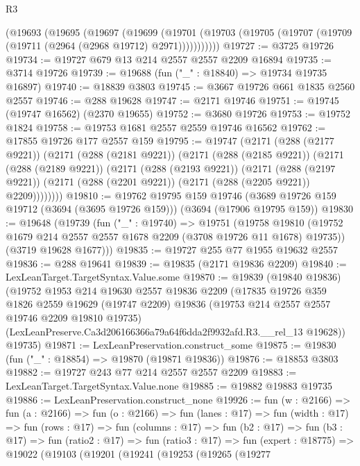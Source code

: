 \begin{lexlean}{R3}
\begin{coremodule}
    (@19693
      (@19695
        (@19697
          (@19699
            (@19701 (@19703 (@19705 (@19707 (@19709 (@19711 (@2964 (@2968 @19712) @2971)))))))))))
@19727 := @3725 @19726
@19734 := @19727 @679 @13 @214 @2557 @2557 @2209 @16894
@19735 := @3714 @19726
@19739 := @19688 (fun ("_" : @18840) => @19734 @19735 @16897)
@19740 := @18839 @3803
@19745 := @3667 @19726 @661 @1835 @2560 @2557
@19746 := @288 @19628
@19747 := @2171 @19746
@19751 := @19745 (@19747 @16562) (@2370 @19655)
@19752 := @3680 @19726
@19753 := @19752 @1824
@19758 := @19753 @1681 @2557 @2559 @19746 @16562
@19762 := @17855 @19726 @177 @2557 @159
@19795 := @19747
    (@2171
      (@288 (@2177 @9221))
      (@2171
        (@288 (@2181 @9221))
        (@2171
          (@288 (@2185 @9221))
          (@2171
            (@288 (@2189 @9221))
            (@2171
              (@288 (@2193 @9221))
              (@2171
                (@288 (@2197 @9221))
                (@2171 (@288 (@2201 @9221)) (@2171 (@288 (@2205 @9221)) @2209))))))))
@19810 := @19762
    @19795
    @159
    @19746
    (@3689 @19726 @159 @19712 (@3694 (@3695 @19726 @159)))
    (@3694 (@17906 @19795 @159))
@19830 := @19648
    (@19739
      (fun ("_" : @19740) =>
      @19751
        (@19758 @19810 (@19752 @1679 @214 @2557 @2557 @1678 @2209 (@3708 @19726 @11 @1678) @19735))
        (@3719 @19628 @1677)))
@19835 := @19727 @255 @77 @1955 @19632 @2557
@19836 := @288 @19641
@19839 := @19835 (@2171 @19836 @2209)
@19840 := LexLeanTarget.TargetSyntax.Value.some
@19870 := @19839
    (@19840 @19836)
    (@19752
      @1953
      @214
      @19630
      @2557
      @19836
      @2209
      (@17835
        @19726
        @359
        @1826
        @2559
        @19629
        (@19747 @2209)
        @19836
        (@19753 @214 @2557 @2557 @19746 @2209 @19810 @19735)
        (LexLeanPreserve.Ca3d206166366a79a64f6dda2f9932afd.R3.__rel_13 @19628))
      @19735)
@19871 := LexLeanPreservation.construct_some
@19875 := @19830 (fun ("_" : @18854) => @19870 (@19871 @19836))
@19876 := @18853 @3803
@19882 := @19727 @243 @77 @214 @2557 @2557 @2209
@19883 := LexLeanTarget.TargetSyntax.Value.none
@19885 := @19882 @19883 @19735
@19886 := LexLeanPreservation.construct_none
@19926 := fun (w : @2166) =>
  fun (a : @2166) =>
  fun (o : @2166) =>
  fun (lanes : @17) =>
  fun (width : @17) =>
  fun (rows : @17) =>
  fun (columns : @17) =>
  fun (b2 : @17) =>
  fun (b3 : @17) =>
  fun (ratio2 : @17) =>
  fun (ratio3 : @17) =>
  fun (expert : @18775) =>
  @19022
    (@19103
      (@19201
        (@19241
          (@19253
            (@19265
              (@19277

\end{coremodule}
\end{lexlean}
